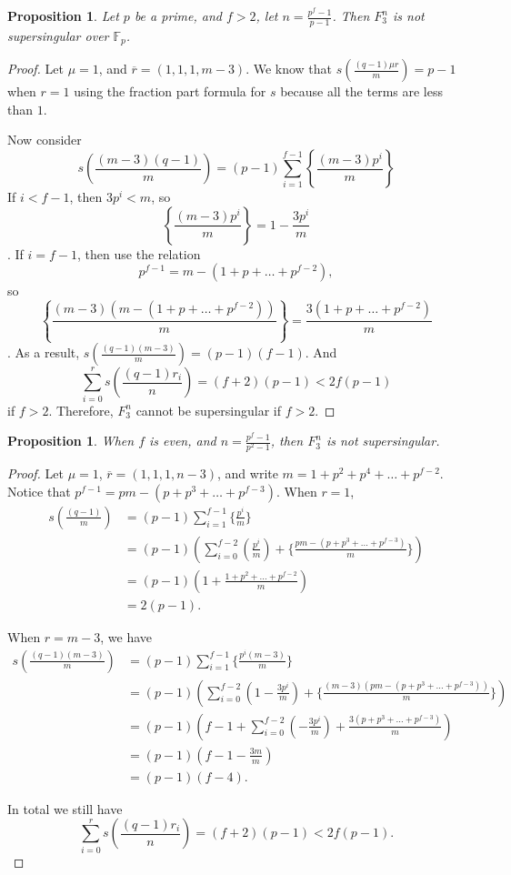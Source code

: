 \documentclass{article}
\newcommand{\F}{\mathbb{F}}
\newtheorem{proposition}[theorem]{Proposition}
\theoremstyle{definition}
\theoremstyle{definition}
\theoremstyle{remark}
\begin{document}
\begin{proposition}
Let $p$ be a prime, and $f > 2$, let $n = \frac{p^f - 1}{p-1}$. Then $F^n_3$ is not supersingular over $\F_p$.
\end{proposition}
\begin{proof}
Let $\mu = 1$, and $\overline r = (1,1,1,m-3)$. We know that $s(\frac{(q-1) \mu r}{m}) = p - 1$ when $r = 1$ using the fraction part formula for $s$ because all the terms are less than $1$.

Now consider \[s\left(\frac{(m-3)(q-1)}{m} \right) = (p-1) \sum_{i = 1}^{f-1} \left\{\frac{(m-3)p^i}{m}\right\}\]
If $i < f - 1$, then $3p^i < m$, so 
$$\left\{\frac{(m-3)p^i}{m}\right\} = 1 - \frac{3p^i}{m}$$. If $i = f - 1$, then use the relation 
\[p^{f - 1} = m - (1 + p + \dots + p^{f - 2}),\] 
so \[ \left\{\frac{(m-3)(m - (1 + p + \dots + p^{f - 2}))}{m} \right\} = \frac{3(1 + p + \dots + p^{f - 2})}{m}\].
As a result, 
$s \left(\frac{(q-1)(m-3)}{m}\right) = (p-1)(f-1)$. 
And \[\sum_{i = 0}^{r} s \left(\frac{(q-1) r_i}{n} \right) = (f+2)(p-1) < 2f(p-1)\] if $f > 2$. 
Therefore, $F^n_3$ cannot be supersingular if $f > 2$. 
\end{proof}
\begin{proposition}
When $f$ is even, and $n = \frac{p^f - 1}{p^2 - 1}$, then $F^n_3$ is not supersingular.
\end{proposition}
\begin{proof}
Let $\mu = 1$, $\overline{r} = (1,1,1, n-3)$, and write $m = 1 + p^2 + p^4 + \dots + p^{f - 2}$. Notice that $p^{f-1} = pm - (p + p^3 + \dots + p^{f-3})$. When $r = 1$, 
\begin{align*}
s(\frac{(q-1)}{m}) &= (p-1) \sum_{i = 1}^{f-1} \{\frac{p^i}{m}\} \\ &= (p-1)(\sum_{i = 0}^{f-2}(\frac{p^i}{m}) + \{\frac{pm - (p + p^3 + \dots + p^{f-3})}{m}\}) \\ &= (p-1)(1 + \frac{1 + p^2 + \dots + p^{f-2}}{m}) \\ &= 2(p-1).
\end{align*}

When $r = m - 3$, we have 
\begin{align*}
s(\frac{(q-1)(m-3)}{m}) &= (p-1) \sum_{i = 1}^{f-1} \{\frac{p^i(m-3)}{m}\} \\ &= (p-1)(\sum_{i = 0}^{f-2}(1 - \frac{3p^i}{m}) + \{\frac{(m-3)(pm - (p + p^3 + \dots + p^{f-3}))}{m}\}) \\ &= (p-1)(f-1 + \sum_{i = 0}^{f-2}(- \frac{3p^i}{m}) + \frac{3(p + p^3 + \dots + p^{f-3})}{m}) \\ &= (p-1)(f - 1 - \frac{3m}{m}) \\ &= (p-1)(f-4).
\end{align*}

In total we still have \[\sum_{i = 0}^{r} s(\frac{(q-1) r_i}{n}) = (f+2)(p-1) < 2f(p-1).\]
\end{proof}
\end{document}
